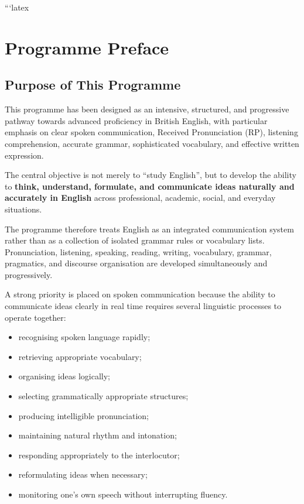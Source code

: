 ```latex
\chapter*{Programme Preface}

\section*{Purpose of This Programme}

This programme has been designed as an intensive, structured, and progressive pathway towards advanced proficiency in British English, with particular emphasis on clear spoken communication, Received Pronunciation (RP), listening comprehension, accurate grammar, sophisticated vocabulary, and effective written expression.

The central objective is not merely to ``study English'', but to develop the ability to \textbf{think, understand, formulate, and communicate ideas naturally and accurately in English} across professional, academic, social, and everyday situations.

The programme therefore treats English as an integrated communication system rather than as a collection of isolated grammar rules or vocabulary lists. Pronunciation, listening, speaking, reading, writing, vocabulary, grammar, pragmatics, and discourse organisation are developed simultaneously and progressively.

A strong priority is placed on spoken communication because the ability to communicate ideas clearly in real time requires several linguistic processes to operate together:

\begin{itemize}
    \item recognising spoken language rapidly;
    \item retrieving appropriate vocabulary;
    \item organising ideas logically;
    \item selecting grammatically appropriate structures;
    \item producing intelligible pronunciation;
    \item maintaining natural rhythm and intonation;
    \item responding appropriately to the interlocutor;
    \item reformulating ideas when necessary;
    \item monitoring one's own speech without interrupting fluency.
\end{itemize}


